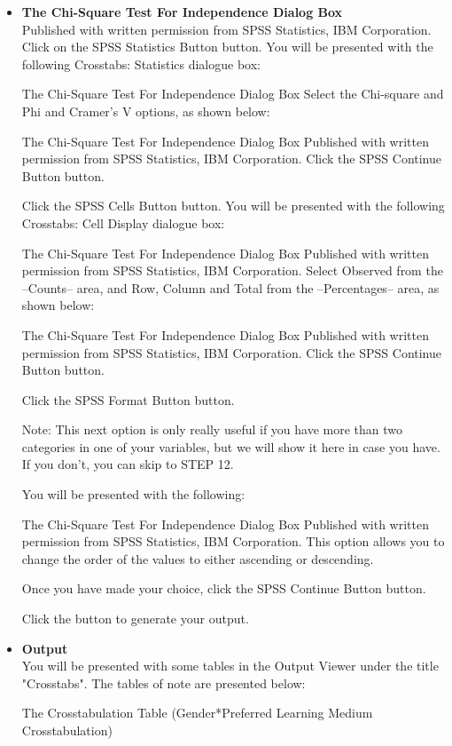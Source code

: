 \documentclass[00-IntroStatsMaster.tex]{subfiles}
\begin{document}
\begin{itemize}
\item \textbf{The Chi-Square Test For Independence Dialog Box}\\
Published with written permission from SPSS Statistics, IBM Corporation.
Click on the SPSS Statistics Button button. You will be presented with the following Crosstabs: Statistics dialogue box:

The Chi-Square Test For Independence Dialog Box
Select the Chi-square and Phi and Cramer's V options, as shown below:

The Chi-Square Test For Independence Dialog Box
Published with written permission from SPSS Statistics, IBM Corporation.
Click the SPSS Continue Button button.

Click the SPSS Cells Button button. You will be presented with the following Crosstabs: Cell Display dialogue box:

The Chi-Square Test For Independence Dialog Box
Published with written permission from SPSS Statistics, IBM Corporation.
Select Observed from the –Counts– area, and Row, Column and Total from the –Percentages– area, as shown below:

The Chi-Square Test For Independence Dialog Box
Published with written permission from SPSS Statistics, IBM Corporation.
Click the SPSS Continue Button button.

Click the SPSS Format Button button.

Note: This next option is only really useful if you have more than two categories in one of your variables, but we will show it here in case you have. If you don't, you can skip to STEP 12.

You will be presented with the following:

The Chi-Square Test For Independence Dialog Box
Published with written permission from SPSS Statistics, IBM Corporation.
This option allows you to change the order of the values to either ascending or descending.

Once you have made your choice, click the SPSS Continue Button button.

Click the  button to generate your output.

\item \textbf{Output}\\
You will be presented with some tables in the Output Viewer under the title "Crosstabs". The tables of note are presented below:

The Crosstabulation Table (Gender*Preferred Learning Medium Crosstabulation)


\end{itemize}
\end{document}
